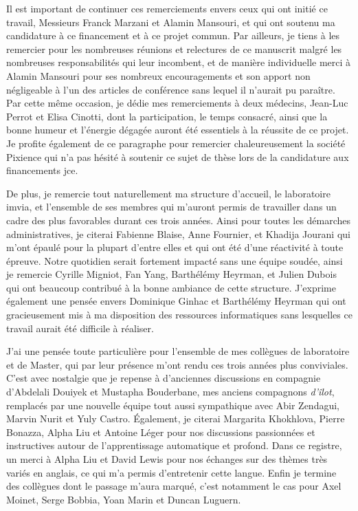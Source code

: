 \documentclass[english,standardlists]{spimubphdthesis}
\begin{document}
Il est important de continuer ces remerciements envers ceux qui ont initié ce travail, Messieurs Franck Marzani et Alamin Mansouri, et qui ont soutenu ma candidature à ce financement et à ce projet commun. Par ailleurs, je tiens à les remercier pour les nombreuses réunions et relectures de ce manuscrit malgré les nombreuses responsabilités qui leur incombent, et de manière individuelle merci à Alamin Mansouri pour ses nombreux encouragements et son apport non négligeable à l'un des articles de conférence sans lequel il n'aurait pu paraître. Par cette même occasion, je dédie mes remerciements à deux médecins, Jean-Luc Perrot et Elisa Cinotti, dont la participation, le temps consacré, ainsi que la bonne humeur et l'énergie dégagée auront été essentiels à la réussite de ce projet. Je profite également de ce paragraphe pour remercier chaleureusement la société Pixience qui n'a pas hésité à soutenir ce sujet de thèse lors de la candidature aux financements \gls{jce}.\par


De plus, je remercie tout naturellement ma structure d'accueil, le laboratoire \gls{imvia}, et l'ensemble de ses membres qui m'auront permis de travailler dans un cadre des plus favorables durant ces trois années. Ainsi pour toutes les démarches administratives, je citerai Fabienne Blaise, Anne Fournier, et Khadija Jourani qui m'ont épaulé pour la plupart d'entre elles et qui ont été d'une réactivité à toute épreuve. Notre quotidien serait fortement impacté sans une équipe soudée, ainsi je remercie Cyrille Migniot, Fan Yang, Barthélémy Heyrman, et Julien Dubois qui ont beaucoup contribué à la bonne ambiance de cette structure. J'exprime également une pensée envers Dominique Ginhac et Barthélémy Heyrman qui ont gracieusement mis à ma disposition des ressources informatiques sans lesquelles ce travail aurait été difficile à réaliser.\par

J'ai une pensée toute particulière pour l'ensemble de mes collègues de laboratoire et de Master, qui par leur présence m'ont rendu ces trois années plus conviviales. C'est avec nostalgie que je repense à d'anciennes discussions en compagnie d'Abdelali Douiyek et Mustapha Bouderbane, mes anciens compagnons \textit{d'îlot}, remplacés par une nouvelle équipe tout aussi sympathique avec Abir Zendagui, Marvin Nurit et Yuly Castro. Également, je citerai Margarita Khokhlova, Pierre Bonazza, Alpha Liu et Antoine Léger pour nos discussions passionnées et instructives autour de l'apprentissage automatique et profond. Dans ce registre, un merci à Alpha Liu et David Lewis pour nos échanges sur des thèmes très variés en anglais, ce qui m'a permis d'entretenir cette langue. Enfin je termine des collègues dont le passage m'aura marqué, c'est notamment le cas pour Axel Moinet, Serge Bobbia, Yoan Marin et Duncan Luguern.\par
\end{document}
